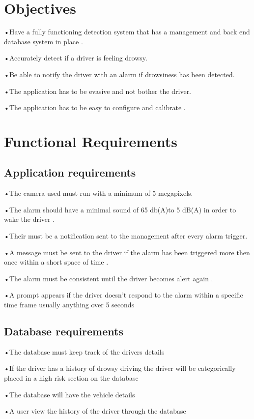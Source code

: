 \section{Objectives}
•Have a fully functioning detection system that has a management and back end database system in place .

•Accurately detect if a driver is feeling drowsy.

•Be able to notify the driver with an alarm if drowsiness has been detected.

•The application has to be evasive and not bother the driver.

•The application has to be easy to configure and calibrate .
\section{Functional Requirements}

\subsection{Application requirements}

•The camera used must run with a minimum of 5 megapixels.

•The alarm should have a minimal sound of 65 db(A)to 5 dB(A) in order to wake the driver  .

•Their must be a notification sent to the management after every alarm trigger.

•A message must be sent to the driver if the alarm has been triggered more then once within a short space of time .

•The alarm must be consistent until the driver becomes alert again .

•A prompt appears if the driver doesn't respond to the alarm within a specific time frame usually anything over 5 seconds

\subsection{Database requirements}

•The database must keep track of the drivers details

•If the driver has a history of drowsy driving the driver will be categorically placed in a high risk section on the database

•The database will have the vehicle details 

•A user view the history of the driver through the database

